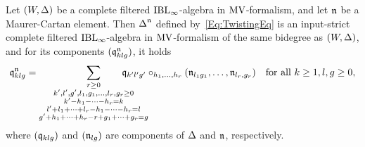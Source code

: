 \documentclass[\MainFolder/Text.tex]{subfiles}
\begin{document}
\begin{Proposition}\label{Eq:TwistingProp}
Let $(W,\operatorname{\Delta})$ be a complete filtered $\mathrm{IBL}_\infty$-algebra in $\mathrm{MV}$-formalism, and let $\mathfrak{n}$ be a Maurer-Cartan element. Then $\operatorname{\Delta}^{\mathfrak{n}}$ defined by~\eqref{Eq:TwistingEq} is an input-strict complete filtered $\mathrm{IBL}_\infty$-algebra in $\mathrm{MV}$-formalism of the same bidegree as $(W,\operatorname{\Delta})$, and for its components $(\mathfrak{q}_{klg}^{\mathfrak{n}})$, it holds
\[ \OPQ^\PMC_{klg} = \sum_{\substack{r\ge 0\\ k', l', g', l_1, g_1, \dotsc, l_{r}, g_{r} \ge 0 \\ k' - h_1 - \dotsb - h_{r}  = k \\ l' + l_1 + \dotsb + l_{r} - h_1 - \dotsb - h_r = l \\ g' + h_1 + \dotsb + h_{r} - r + g_1 + \dotsb+ g_{r} = g}}\hspace{-1cm}\OPQ_{k'l'g'}\circ_{h_1,\dotsc,h_{r}}(\PMC_{l_1 g_1},\dotsc,\PMC_{l_{r},g_{r}})\quad\text{for all }k\ge 1, l, g\ge 0, \]
where $(\mathfrak{q}_{klg})$ and $(\mathfrak{n}_{lg})$ are components of $\operatorname{\Delta}$ and $\mathfrak{n}$, respectively.
\end{Proposition}
\end{document}
